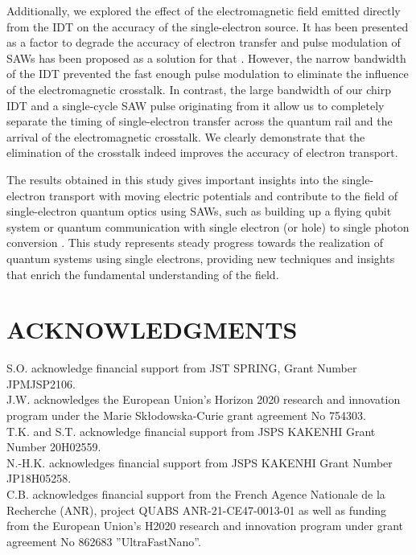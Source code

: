 \documentclass{article}
\begin{document}
Additionally, we explored the effect of the electromagnetic field emitted directly from the IDT on the accuracy of the single-electron source. It has been presented as a factor to degrade the accuracy of electron transfer and pulse modulation of SAWs has been proposed as a solution for that \cite{Kataoka2006}. However, the narrow bandwidth of the IDT prevented the fast enough pulse modulation to eliminate the influence of the electromagnetic crosstalk. In contrast, the large bandwidth of our chirp IDT and a single-cycle SAW pulse originating from it allow us to completely separate the timing of single-electron transfer across the quantum rail and the arrival of the electromagnetic crosstalk. We clearly demonstrate that the elimination of the crosstalk indeed improves the accuracy of electron transport.

The results obtained in this study gives important insights into the single-electron transport with moving electric potentials and contribute to the field of single-electron quantum optics using SAWs, such as building up a flying qubit system or quantum communication with single electron (or hole) to single photon conversion \cite{Hsiao2020}. This study represents steady progress towards the realization of quantum systems using single electrons, providing new techniques and insights that enrich the fundamental understanding of the field.

\section*{ACKNOWLEDGMENTS}
S.O. acknowledge financial support from JST SPRING, Grant Number JPMJSP2106.\\
J.W. acknowledges the European Union's Horizon 2020 research and innovation program under the Marie Skłodowska-Curie grant agreement No 754303. \\
T.K. and S.T. acknowledge financial support from JSPS KAKENHI Grant Number 20H02559. \\
N.-H.K. acknowledges financial support from JSPS KAKENHI Grant Number JP18H05258. \\
C.B. acknowledges financial support from
the French Agence Nationale de la Recherche (ANR), project QUABS ANR-21-CE47-0013-01 as well as funding from the European Union’s H2020 research and innovation program under grant agreement No 862683 ”UltraFastNano”.\\
\end{document}
